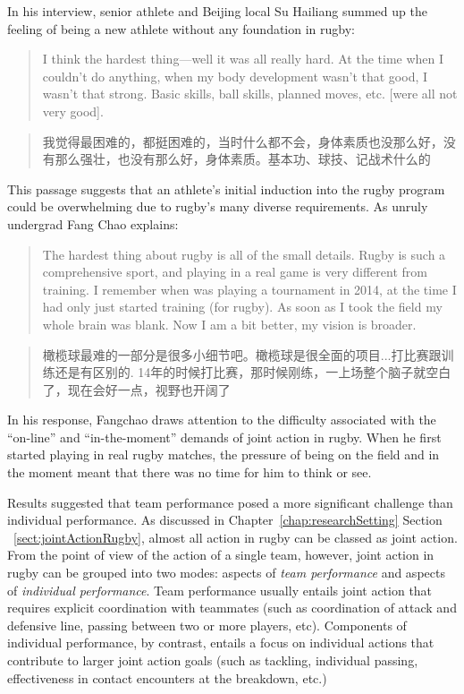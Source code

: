 \begin{CJK}{UTF8}{gbsn}
In his interview, senior athlete and Beijing local Su Hailiang summed up the feeling of being a new athlete without any foundation in rugby:

\begin{quote}
    I think the hardest thing---well it was all really hard.  At the time when I couldn't do anything, when my body development wasn't that good, I wasn't that strong.  Basic skills, ball skills, planned moves, etc. [were all not very good].
\end{quote}

\begin{quote}
    我觉得最困难的，都挺困难的，当时什么都不会，身体素质也没那么好，没有那么强壮，也没有那么好，身体素质。基本功、球技、记战术什么的 
\end{quote}

This passage suggests that an athlete's initial induction into the rugby program could be overwhelming due to rugby's many diverse requirements.  As unruly undergrad Fang Chao explains:

\begin{quote}
  The hardest thing about rugby is all of the small details. Rugby is such a comprehensive sport, and playing in a real game is very different from training. I remember when was playing a tournament in 2014, at the time I had only just started training (for rugby).  As soon as I took the field my whole brain was blank.  Now I am a bit better, my vision is broader.
\end{quote}

\begin{quote}
  橄榄球最难的一部分是很多小细节吧。橄榄球是很全面的项目...打比赛跟训练还是有区别的. 14年的时候打比赛，那时候刚练，一上场整个脑子就空白了，现在会好一点，视野也开阔了
\end{quote}

In his response, Fangchao draws attention to the difficulty associated with the ``on-line'' and ``in-the-moment'' demands of joint action in rugby.  When he first started playing in real rugby matches, the pressure of being on the field and in the moment meant that there was no time for him to think or see.

Results suggested that team performance posed a more significant challenge than individual performance.  As discussed in Chapter~\ref{chap:researchSetting} Section ~\ref{sect:jointActionRugby}, almost all action in rugby can be classed as joint action.  From the point of view of the action of a single team, however, joint action in rugby can be grouped into two modes: aspects of \textit{team performance} and aspects of \textit{individual performance}.  Team performance usually entails joint action that requires explicit coordination with teammates (such as coordination of attack and defensive line, passing between two or more players, etc).  Components of individual performance, by contrast, entails a focus on individual actions that contribute to larger joint action goals (such as tackling, individual passing, effectiveness in contact encounters at the breakdown, etc.)


\end{CJK}
